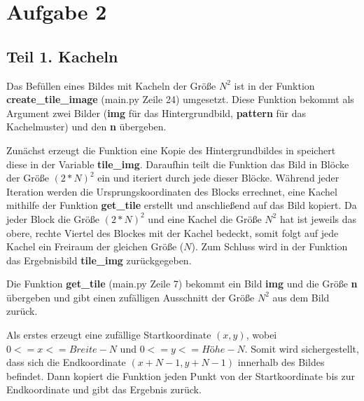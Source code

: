 \documentclass[12pt]{article}
\begin{document}

\section*{Aufgabe 2}
\subsection*{Teil 1. Kacheln}
Das Befüllen eines Bildes mit Kacheln der Größe $N^2$ ist in der Funktion \textbf{create\_tile\_image} (main.py Zeile 24) umgesetzt. Diese Funktion bekommt als Argument zwei Bilder (\textbf{img} für das Hintergrundbild, \textbf{pattern} für das Kachelmuster) und den \textbf{n} übergeben.

Zunächst erzeugt die Funktion eine Kopie des Hintergrundbildes in speichert diese in der Variable \textbf{tile\_img}.
Daraufhin teilt die Funktion das Bild in Blöcke der Größe $(2*N)^2$ ein und iteriert durch jede dieser Blöcke.
Während jeder Iteration werden die Ursprungskoordinaten des Blocks errechnet, eine Kachel mithilfe der Funktion \textbf{get\_tile} erstellt und anschließend auf das Bild kopiert.
Da jeder Block die Größe $(2*N)^2$ und eine Kachel die Größe $N^2$ hat ist jeweils das obere, rechte Viertel des Blockes mit der Kachel bedeckt, somit folgt auf jede Kachel ein Freiraum der gleichen Größe ($N$).
Zum Schluss wird in der Funktion das Ergebnisbild \textbf{tile\_img} zurückgegeben.

Die Funktion \textbf{get\_tile} (main.py Zeile 7) bekommt ein Bild \textbf{img} und die Größe \textbf{n} übergeben und gibt einen zufälligen Ausschnitt der Größe $N^2$ aus dem Bild zurück.

Als erstes erzeugt eine zufällige Startkoordinate $(x, y)$, wobei $0 <= x <= Breite - N$ und $0 <= y <= Höhe - N$. Somit wird sichergestellt, dass sich die Endkoordinate $(x + N - 1, y + N - 1)$ innerhalb des Bildes befindet.
Dann kopiert die Funktion jeden Punkt von der Startkoordinate bis zur Endkoordinate und gibt das Ergebnis zurück.
\end{document}
